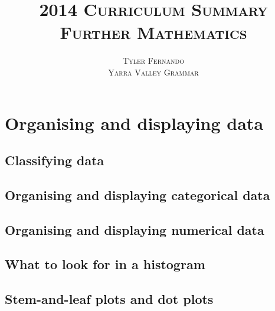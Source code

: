 \documentclass[a4paper,11pt]{article}
\title{\LARGE \scshape{2014 Curriculum Summary} \\ \Huge \scshape{Further Mathematics}}
\author{\Large \scshape{Tyler Fernando} \\ \small \scshape{Yarra Valley Grammar}}
\date{}
\begin{document}
\maketitle
\thispagestyle{empty}
\pagestyle{empty}

\tableofcontents

\newpage

\pagestyle{plain}

\setcounter{page}{1}

\section{Organising and displaying data}
\begin{outline}

\0
\subsection{Classifying data}

\0
\subsection{Organising and displaying categorical data}

\0
\subsection{Organising and displaying numerical data}

\0
\subsection{What to look for in a histogram}

\0
\subsection{Stem-and-leaf plots and dot plots}

\end{outline}

\newpage
\end{document}
